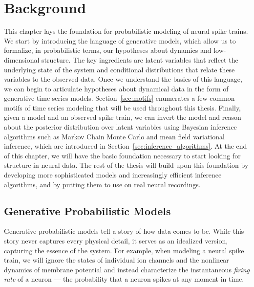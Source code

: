 
\chapter{Background}
\label{chap:two}

This chapter lays the foundation for probabilistic modeling of neural
spike trains.  We start by introducing the language of generative
models, which allow us to formalize, in probabilistic terms, our
hypotheses about dynamics and low-dimensional structure.  The key
ingredients are latent variables that reflect the underlying state of
the system and conditional distributions that relate these variables
to the observed data.  Once we understand the basics of this language,
we can begin to articulate hypotheses about dynamical data in the form
of generative time series models.  Section~\ref{sec:motifs} enumerates
a few common motifs of time series modeling that will be used
throughout this thesis.  Finally, given a model and an observed spike
train, we can invert the model and reason about the posterior
distribution over latent variables using Bayesian inference algorithms
such as Markov Chain Monte Carlo and mean field variational inference,
which are introduced in Section~\ref{sec:inference_algorithms}.  At
the end of this chapter, we will have the basic foundation necessary
to start looking for structure in neural data. The rest of the thesis
will build upon this foundation by developing more sophisticated
models and increasingly efficient inference algorithms, and by putting them to
use on real neural recordings.

\section{Generative Probabilistic Models}
\label{sec:generative_models}
Generative probabilistic models tell a story of how data comes to be. 
While this story never captures every physical detail, it serves as an 
idealized version, capturing the essence of the system. For example, when
modeling a neural spike train, we will ignore the states of individual ion 
channels and the nonlinear dynamics of membrane potential and instead 
characterize the instantaneous \emph{firing rate} of a neuron --- the 
probability that a neuron spikes at any moment in time. 

